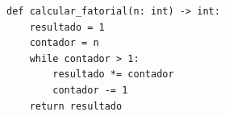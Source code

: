 \ifmostrarGabarito
\begin{verbatim}
def calcular_fatorial(n: int) -> int:
    resultado = 1
    contador = n
    while contador > 1:
        resultado *= contador
        contador -= 1
    return resultado
\end{verbatim}

\fi
